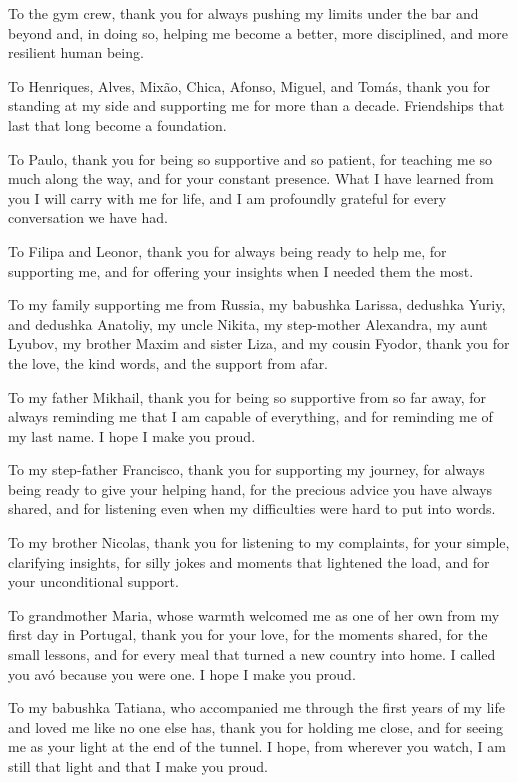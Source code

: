 \documentclass[11pt,a4paper,oneside]{article}
\begin{document}
To the gym crew, thank you for always pushing my limits under the bar and beyond and, in doing so, helping me become a better, more disciplined, and more resilient human being.

To Henriques, Alves, Mixão, Chica, Afonso, Miguel, and Tomás, thank you for standing at my side and supporting me for more than a decade. Friendships that last that long become a foundation.

To Paulo, thank you for being so supportive and so patient, for teaching me so much along the way, and for your constant presence. What I have learned from you I will carry with me for life, and I am profoundly grateful for every conversation we have had.

To Filipa and Leonor, thank you for always being ready to help me, for supporting me, and for offering your insights when I needed them the most.

To my family supporting me from Russia, my babushka Larissa, dedushka Yuriy, and dedushka Anatoliy, my uncle Nikita, my step-mother Alexandra, my aunt Lyubov, my brother Maxim and sister Liza, and my cousin Fyodor, thank you for the love, the kind words, and the support from afar.

To my father Mikhail, thank you for being so supportive from so far away, for always reminding me that I am capable of everything, and for reminding me of my last name. I hope I make you proud.

To my step-father Francisco, thank you for supporting my journey, for always being ready to give your helping hand, for the precious advice you have always shared, and for listening even when my difficulties were hard to put into words.

To my brother Nicolas, thank you for listening to my complaints, for your simple, clarifying insights, for silly jokes and moments that lightened the load, and for your unconditional support.

To grandmother Maria, whose warmth welcomed me as one of her own from my first day in Portugal, thank you for your love, for the moments shared, for the small lessons, and for every meal that turned a new country into home. I called you avó because you were one. I hope I make you proud.
 
To my babushka Tatiana, who accompanied me through the first years of my life and loved me like no one else has, thank you for holding me close, and for seeing me as your light at the end of the tunnel. I hope, from wherever you watch, I am still that light and that I make you proud.
\end{document}
